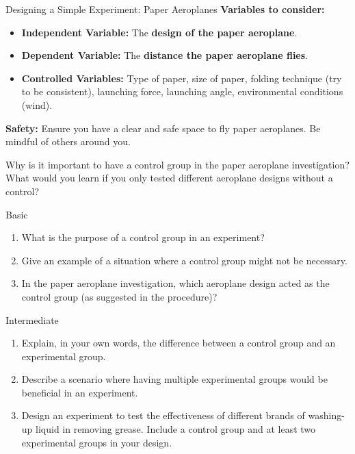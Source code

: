 \begin{investigation}{Designing a Simple Experiment: Paper Aeroplanes}
\textbf{Variables to consider:}
\begin{itemize}
    \item \textbf{Independent Variable:} The \textbf{design of the paper aeroplane}.
    \item \textbf{Dependent Variable:} The \textbf{distance the paper aeroplane flies}.
    \item \textbf{Controlled Variables:} Type of paper, size of paper, folding technique (try to be consistent), launching force, launching angle, environmental conditions (wind).
\end{itemize}

\textbf{Safety:} Ensure you have a clear and safe space to fly paper aeroplanes. Be mindful of others around you.

\end{investigation}

\begin{stopandthink}
Why is it important to have a control group in the paper aeroplane investigation? What would you learn if you only tested different aeroplane designs without a control?
\end{stopandthink}

\begin{tieredquestions}{Basic}
\begin{enumerate}
    \item What is the purpose of a control group in an experiment?
    \item Give an example of a situation where a control group might not be necessary.
    \item In the paper aeroplane investigation, which aeroplane design acted as the control group (as suggested in the procedure)?
\end{enumerate}
\end{tieredquestions}

\begin{tieredquestions}{Intermediate}
\begin{enumerate}
    \item Explain, in your own words, the difference between a control group and an experimental group.
    \item Describe a scenario where having multiple experimental groups would be beneficial in an experiment.
    \item  Design an experiment to test the effectiveness of different brands of washing-up liquid in removing grease.  Include a control group and at least two experimental groups in your design.
\end{enumerate}
\end{tieredquestions}


